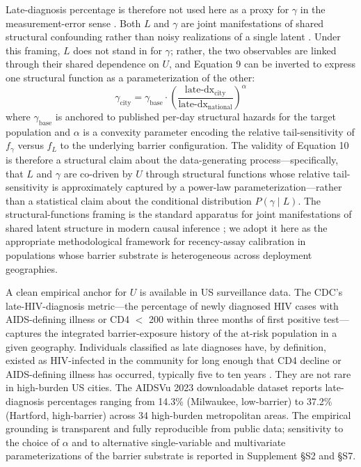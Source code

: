 \documentclass[12pt]{article}
\begin{document}
Late-diagnosis percentage is therefore not used here as a proxy for $\gamma$ in the measurement-error sense \cite{kuroki_pearl}. Both $L$ and $\gamma$ are joint manifestations of shared structural confounding rather than noisy realizations of a single latent \cite{wang_blei,miao_tt}. Under this framing, $L$ does not stand in for $\gamma$; rather, the two observables are linked through their shared dependence on $U$, and Equation 9 can be inverted to express one structural function as a parameterization of the other:
\begin{equation}
\gamma_{\mathrm{city}} = \gamma_{\mathrm{base}} \cdot \left(\frac{\text{late-dx}_{\mathrm{city}}}{\text{late-dx}_{\mathrm{national}}}\right)^{\alpha}
\end{equation}
where $\gamma_{\mathrm{base}}$ is anchored to published per-day structural hazards for the target population \cite{cdc_hiv2023,cdc_nhbs2023,bjs2023} and $\alpha$ is a convexity parameter encoding the relative tail-sensitivity of $f_\gamma$ versus $f_L$ to the underlying barrier configuration. The validity of Equation 10 is therefore a structural claim about the data-generating process---specifically, that $L$ and $\gamma$ are co-driven by $U$ through structural functions whose relative tail-sensitivity is approximately captured by a power-law parameterization---rather than a statistical claim about the conditional distribution $P(\gamma \mid L)$. The structural-functions framing is the standard apparatus for joint manifestations of shared latent structure in modern causal inference \cite{proximal_causal,pearl_causality}; we adopt it here as the appropriate methodological framework for recency-assay calibration in populations whose barrier substrate is heterogeneous across deployment geographies.

A clean empirical anchor for $U$ is available in US surveillance data. The CDC's late-HIV-diagnosis metric---the percentage of newly diagnosed HIV cases with AIDS-defining illness or CD4 $<$ 200 within three months of first positive test---captures the integrated barrier-exposure history of the at-risk population in a given geography. Individuals classified as late diagnoses have, by definition, existed as HIV-infected in the community for long enough that CD4 decline or AIDS-defining illness has occurred, typically five to ten years \cite{cdc_hiv2023}. They are not rare in high-burden US cities. The AIDSVu 2023 downloadable dataset \cite{aidsvu2023} reports late-diagnosis percentages ranging from 14.3\% (Milwaukee, low-barrier) to 37.2\% (Hartford, high-barrier) across 34 high-burden metropolitan areas. The empirical grounding is transparent and fully reproducible from public data; sensitivity to the choice of $\alpha$ and to alternative single-variable and multivariate parameterizations of the barrier substrate is reported in Supplement \S S2 and \S S7.
\end{document}
